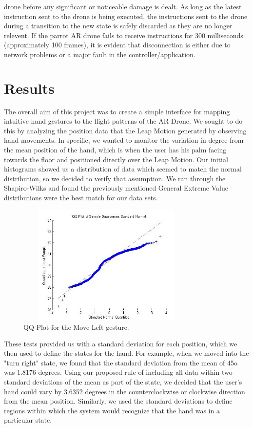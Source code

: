 \documentclass[letterpaper,english, 12pt]{article}
\begin{document}
drone before any significant or noticeable  damage is dealt. As long as the latest instruction sent to the drone is being executed, the instructions sent to the drone during a transition to the new state is safely discarded as they are no longer relevent. If the parrot AR drone fails to receive instructions for 300 milliseconds (approximately 100 frames), it  is evident that disconnection is either due to network problems or a major fault in the controller/application. 


\section*{Results}

The overall aim of this project was to create a simple interface for mapping intuitive hand gestures to the flight patterns of the AR Drone. We sought to do this by analyzing the position data that the Leap Motion generated by observing hand movements. In specific, we wanted to monitor the variation in degree from the mean position of the hand, which is when the user has his palm facing towards the floor and positioned directly over the Leap Motion. Our initial histograms showed us a distribution of data which seemed to match the normal distribution, so we decided to verify that assumption. We ran through the Shapiro-Wilks and found the previously mentioned General Extreme Value distributions were the best match for our data sets.

\begin{figure}[H]
	\centering
	\includegraphics[height=6cm,width=90mm]{pics/qqLeft.jpg}
	\caption{QQ Plot for the Move Left gesture.}
\end{figure}

These tests provided us with a standard deviation for each position, which we then used to define the states for the hand. For example, when we moved into the "turn right" state, we found that the standard deviation from the mean of 45o was 1.8176 degrees. Using our proposed rule of including all data within two standard deviations of the mean as part of the state, we decided that the user's hand could vary by 3.6352 degrees in the counterclockwise or clockwise direction from the mean position. Similarly, we used the standard deviations to define regions within which the system would recognize that the hand was in a particular state.
\end{document}
